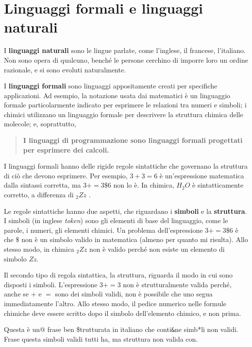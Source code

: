 \documentclass[10pt]{book}
\begin{document}
\section{Linguaggi formali e linguaggi naturali}

I {\bf linguaggi naturali} sono le lingue parlate, come l'inglese, il francese, l'italiano. Non sono opera di qualcuno, benché le persone cerchino di imporre loro un ordine razionale, e si sono evoluti naturalmente.

I {\bf linguaggi formali} sono linguaggi appositamente creati per specifiche applicazioni. Ad esempio, la notazione usata dai matematici è un linguaggio formale particolarmente indicato per esprimere le relazioni tra numeri e simboli; i chimici utilizzano un linguaggio formale per descrivere la struttura chimica delle molecole; e, soprattutto, 

\begin{quote}
{\bf I linguaggi di programmazione sono linguaggi formali progettati per esprimere dei calcoli.}
\end{quote}

I linguaggi formali hanno delle rigide regole sintattiche che governano la struttura di ciò che devono esprimere. Per esempio,
$3 + 3 = 6$ è un'espressione matematica dalla sintassi corretta, ma
$3 += 3 \$ 6$ non lo è.
In chimica, $H_2O$ è sintatticamente corretto, a differenza di $_2Zz$ .

Le regole sintattiche hanno due aspetti, che riguardano i {\bf simboli} e la
{\bf struttura}. I simboli (in inglese {\em token}) sono gli elementi di base del linguaggio, come le parole, i numeri, gli elementi chimici. Un problema dell'espressione $3 += 3 \$ 6$ è che \( \$ \) non è un simbolo valido in matematica (almeno per quanto mi risulta). Allo stesso modo, in chimica $_2Zz$ non è valido perché non esiste un elemento di simbolo $Zz$.

Il secondo tipo di regola sintattica, la struttura, riguarda il modo in cui sono disposti i simboli. L'espressione $3 += 3$ non è strutturalmente valida perché, anche se $+$ e $=$ sono dei simboli validi, non è possibile che uno segua immediatamente l'altro. Allo stesso modo, il pedice numerico nelle formule chimiche deve essere scritto dopo il simbolo dell'elemento chimico, e non prima.

Questa è un@ frase ben \$trutturata in italiano che conti\verb'&'ne simb*li non validi.\\
Frase questa simboli validi tutti ha, ma struttura non valida con.
\end{document}
